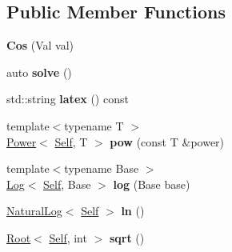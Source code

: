 \subsection*{Public Member Functions}
\begin{DoxyCompactItemize}
\item 
\hypertarget{classlatex_1_1math_1_1Cos_a00d8238b1b96698e137d285e746e5bd0}{{\bfseries Cos} (Val val)}\label{classlatex_1_1math_1_1Cos_a00d8238b1b96698e137d285e746e5bd0}

\item 
\hypertarget{classlatex_1_1math_1_1Cos_abdbafc7009e9be6ce738052aafd109f9}{auto {\bfseries solve} ()}\label{classlatex_1_1math_1_1Cos_abdbafc7009e9be6ce738052aafd109f9}

\item 
\hypertarget{classlatex_1_1math_1_1Cos_a09706240be9ca5a03af56bd4e6ee5db8}{std\-::string {\bfseries latex} () const }\label{classlatex_1_1math_1_1Cos_a09706240be9ca5a03af56bd4e6ee5db8}

\item 
\hypertarget{classlatex_1_1math_1_1Cos_a762f1a56defbf20c544756a5cefef40e}{{\footnotesize template$<$typename T $>$ }\\\hyperlink{classlatex_1_1math_1_1Power}{Power}$<$ \hyperlink{classlatex_1_1math_1_1Cos}{Self}, T $>$ {\bfseries pow} (const T \&power)}\label{classlatex_1_1math_1_1Cos_a762f1a56defbf20c544756a5cefef40e}

\item 
\hypertarget{classlatex_1_1math_1_1Cos_a9234d42396d1a761ed41289215431b78}{{\footnotesize template$<$typename Base $>$ }\\\hyperlink{classlatex_1_1math_1_1Log}{Log}$<$ \hyperlink{classlatex_1_1math_1_1Cos}{Self}, Base $>$ {\bfseries log} (Base base)}\label{classlatex_1_1math_1_1Cos_a9234d42396d1a761ed41289215431b78}

\item 
\hypertarget{classlatex_1_1math_1_1Cos_a94359c6ef1a1c525f3b4729c6f7cb665}{\hyperlink{classlatex_1_1math_1_1NaturalLog}{Natural\-Log}$<$ \hyperlink{classlatex_1_1math_1_1Cos}{Self} $>$ {\bfseries ln} ()}\label{classlatex_1_1math_1_1Cos_a94359c6ef1a1c525f3b4729c6f7cb665}

\item 
\hypertarget{classlatex_1_1math_1_1Cos_afc496ab4e4d007e52b74e3cf87fe4b4f}{\hyperlink{classlatex_1_1math_1_1Root}{Root}$<$ \hyperlink{classlatex_1_1math_1_1Cos}{Self}, int $>$ {\bfseries sqrt} ()}\label{classlatex_1_1math_1_1Cos_afc496ab4e4d007e52b74e3cf87fe4b4f}

\end{DoxyCompactItemize}
